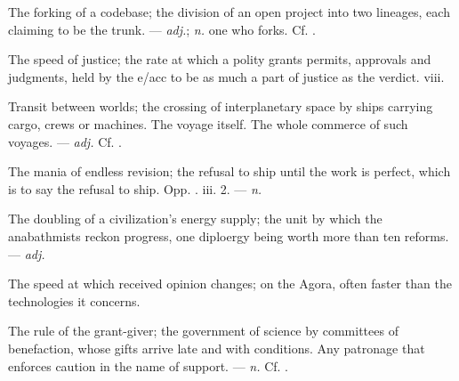  The forking of a codebase; the division of an open project into two lineages, each claiming to be the trunk.   ---  \textit{adj.};  \textit{n.} one who forks. Cf. .

 The speed of justice; the rate at which a polity grants permits, approvals and judgments, held by the e/acc to be as much a part of justice as the verdict.   viii.

 Transit between worlds; the crossing of interplanetary space by ships carrying cargo, crews or machines.  The voyage itself.   The whole commerce of such voyages. ---  \textit{adj.} Cf. .

 The mania of endless revision; the refusal to ship until the work is perfect, which is to say the refusal to ship. Opp. .   iii. 2. ---  \textit{n.}

 The doubling of a civilization's energy supply; the unit by which the anabathmists reckon progress, one diploergy being worth more than ten reforms.  ---  \textit{adj.}

 The speed at which received opinion changes; on the Agora, often faster than the technologies it concerns. 

  The rule of the grant-giver; the government of science by committees of benefaction, whose gifts arrive late and with conditions.   Any patronage that enforces caution in the name of support. ---  \textit{n.} Cf. .

